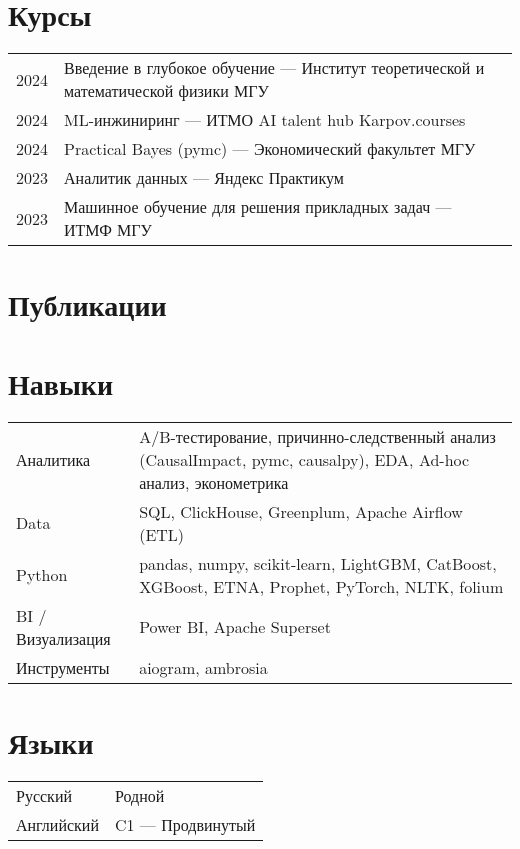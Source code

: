\documentclass[a4paper,12pt]{article}
\begin{document}
\section{Курсы}
\begin{tabularx}{\linewidth}{@{}l X@{}}
2024 & Введение в глубокое обучение — Институт теоретической и математической физики МГУ \\
2024 & ML-инжиниринг — ИТМО AI talent hub \texttimes{} Karpov.courses \\
2024 & Practical Bayes (pymc) — Экономический факультет МГУ \\
2023 & Аналитик данных — Яндекс Практикум \\
2023 & Машинное обучение для решения прикладных задач — ИТМФ МГУ \\
\end{tabularx}

\section{Публикации}
\begin{refsection}
\nocite{*}
\printbibliography[heading=none]
\end{refsection}

\section{Навыки}
\begin{tabularx}{\linewidth}{@{}l X@{}}
Аналитика &  \normalsize{A/B-тестирование, причинно-следственный анализ (CausalImpact, pymc, causalpy), EDA, Ad-hoc анализ, эконометрика}\\
Data &  \normalsize{SQL, ClickHouse, Greenplum, Apache Airflow (ETL)}\\
Python &  \normalsize{pandas, numpy, scikit-learn, LightGBM, CatBoost, XGBoost, ETNA, Prophet, PyTorch, NLTK, folium}\\
BI / Визуализация &  \normalsize{Power BI, Apache Superset}\\
Инструменты &  \normalsize{aiogram, ambrosia}\\
\end{tabularx}

\section{Языки}
\begin{tabularx}{\linewidth}{@{}l X@{}}
Русский & Родной \\
Английский & C1 — Продвинутый \\
\end{tabularx}

\vfill
{}
\end{document}
